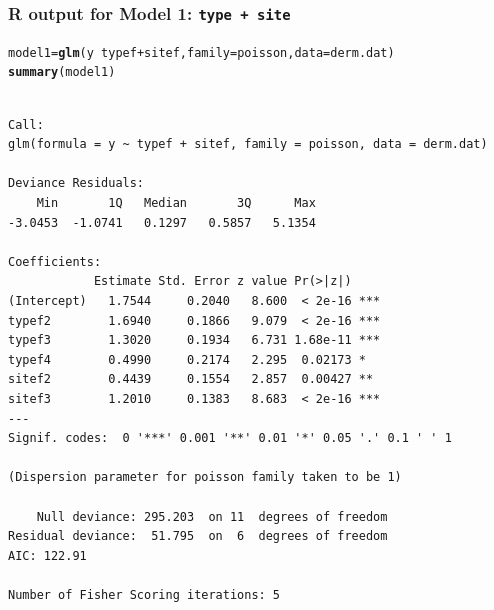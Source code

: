 \documentclass[oneside]{book}\usepackage[]{graphicx}\usepackage[svgnames]{xcolor}
\makeatletter
\newcommand{\hlopt}[1]{\textcolor[rgb]{0,0,0}{#1}}%
\newcommand{\hlstd}[1]{\textcolor[rgb]{0.345,0.345,0.345}{#1}}%
\newcommand{\hlkwb}[1]{\textcolor[rgb]{0.69,0.353,0.396}{#1}}%
\newcommand{\hlkwc}[1]{\textcolor[rgb]{0.333,0.667,0.333}{#1}}%
\newcommand{\hlkwd}[1]{\textcolor[rgb]{0.737,0.353,0.396}{\textbf{#1}}}%
\newenvironment{kframe}{%
 \def\at@end@of@kframe{}%
 \ifinner\ifhmode%
  \def\at@end@of@kframe{\end{minipage}}%
  \begin{minipage}{\columnwidth}%
 \fi\fi%
 \def\FrameCommand##1{\hskip\@totalleftmargin \hskip-\fboxsep
 \colorbox{shadecolor}{##1}\hskip-\fboxsep
     \hskip-\linewidth \hskip-\@totalleftmargin \hskip\columnwidth}%
 \MakeFramed {\advance\hsize-\width
   \@totalleftmargin\z@ \linewidth\hsize
   \@setminipage}}%
 {\par\unskip\endMakeFramed%
 \at@end@of@kframe}
\newenvironment{knitrout}{}{} %
\makeatother
\begin{document}
\subsubsection*{R output for Model 1: \texttt{type + site}}
\begin{knitrout}
\color{fgcolor}\begin{kframe}
\begin{alltt}
\hlstd{model1} \hlkwb{=} \hlkwd{glm}\hlstd{(y} \hlopt{~} \hlstd{typef} \hlopt{+} \hlstd{sitef,} \hlkwc{family} \hlstd{= poisson,} \hlkwc{data} \hlstd{= derm.dat)}
\hlkwd{summary}\hlstd{(model1)}
\end{alltt}
\begin{verbatim}

Call:
glm(formula = y ~ typef + sitef, family = poisson, data = derm.dat)

Deviance Residuals: 
    Min       1Q   Median       3Q      Max  
-3.0453  -1.0741   0.1297   0.5857   5.1354  

Coefficients:
            Estimate Std. Error z value Pr(>|z|)    
(Intercept)   1.7544     0.2040   8.600  < 2e-16 ***
typef2        1.6940     0.1866   9.079  < 2e-16 ***
typef3        1.3020     0.1934   6.731 1.68e-11 ***
typef4        0.4990     0.2174   2.295  0.02173 *  
sitef2        0.4439     0.1554   2.857  0.00427 ** 
sitef3        1.2010     0.1383   8.683  < 2e-16 ***
---
Signif. codes:  0 '***' 0.001 '**' 0.01 '*' 0.05 '.' 0.1 ' ' 1

(Dispersion parameter for poisson family taken to be 1)

    Null deviance: 295.203  on 11  degrees of freedom
Residual deviance:  51.795  on  6  degrees of freedom
AIC: 122.91

Number of Fisher Scoring iterations: 5
\end{verbatim}
\end{kframe}
\end{knitrout}
\end{document}

